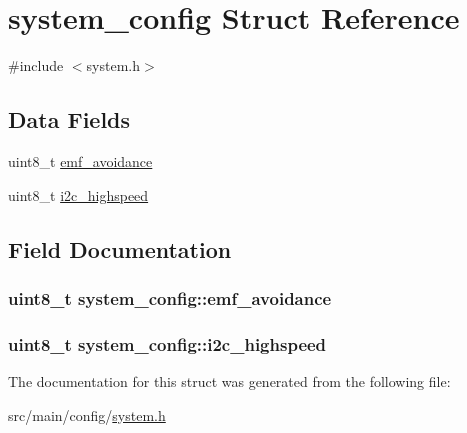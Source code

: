 \hypertarget{structsystem__config}{\section{system\+\_\+config Struct Reference}
\label{structsystem__config}
}


{\ttfamily \#include $<$system.\+h$>$}

\subsection*{Data Fields}
\begin{DoxyCompactItemize}
\item 
uint8\+\_\+t \hyperlink{structsystem__config_ae2541b5333bcc4eabbde07a663b48c44}{emf\+\_\+avoidance}
\item 
uint8\+\_\+t \hyperlink{structsystem__config_aed4235031e6b877fd08ff7889018825d}{i2c\+\_\+highspeed}
\end{DoxyCompactItemize}


\subsection{Field Documentation}
\hypertarget{structsystem__config_ae2541b5333bcc4eabbde07a663b48c44}{
\subsubsection[{emf\+\_\+avoidance}]{\setlength{\rightskip}{0pt plus 5cm}uint8\+\_\+t system\+\_\+config\+::emf\+\_\+avoidance}}\label{structsystem__config_ae2541b5333bcc4eabbde07a663b48c44}
\hypertarget{structsystem__config_aed4235031e6b877fd08ff7889018825d}{
\subsubsection[{i2c\+\_\+highspeed}]{\setlength{\rightskip}{0pt plus 5cm}uint8\+\_\+t system\+\_\+config\+::i2c\+\_\+highspeed}}\label{structsystem__config_aed4235031e6b877fd08ff7889018825d}


The documentation for this struct was generated from the following file\+:\begin{DoxyCompactItemize}
\item 
src/main/config/\hyperlink{config_2system_8h}{system.\+h}\end{DoxyCompactItemize}
